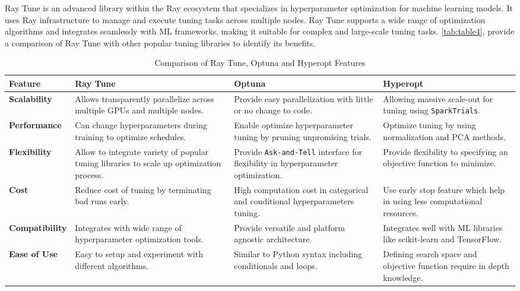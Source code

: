 Ray Tune is an advanced library within the Ray ecosystem that specializes in hyperparameter optimization for machine learning models. It uses Ray infrastructure to manage and execute tuning tasks across multiple nodes. Ray Tune supports a wide range of optimization algorithms and integrates seamlessly with ML frameworks, making it suitable for complex and large-scale tuning tasks. \autoref{tab:table4}, provide a comparison of Ray Tune with other popular tuning libraries to identify its benefits. \cite{ray_doc}



\begin{table}[ht]
\centering
\begin{tabular}{|p{3cm}|p{3.8cm}|p{3.8cm}|p{3.8cm}|}
\hline
\textbf{Feature} & \textbf{Ray Tune} & \textbf{Optuna} & \textbf{	Hyperopt} \\
\hline
\textbf{Scalability} & Allows transparently parallelize across multiple GPUs and multiple nodes. \cite{ray_doc}& Provide easy parallelization with little or no change to code. \cite{optuna_docs} & Allowing massive scale-out for tuning using \texttt{SparkTrials}. \cite{hyperopt_docs}\\
\hline
\textbf{Performance} & Can change hyperparameters during training to optimize schedules. \cite{ray_doc}& Enable optimize hyperparameter tuning by pruning unpromising trials. \cite{optuna_docs} & Optimize tuning by using normalization and PCA methods. \cite{komer2014hyperopt}\\
\hline
\textbf{Flexibility} & Allow to integrate variety of popular tuning libraries to scale up optimization process. \cite{ray_doc}& Provide \texttt{Ask-and-Tell} interface for flexibility in hyperparameter optimization. \cite{optuna_docs}& Provide flexibility to specifying an objective function to minimize. \cite{hyperopt_docs} \\
\hline
\textbf{Cost} & Reduce cost of tuning by terminating bad runs early. \cite{ray_doc} & High computation cost in categorical and conditional hyperparameters tuning. \cite{optuna_docs} & Use early stop feature which help in using less computational resources. \cite{pokhrel2023comparison}\\
\hline
\textbf{Compatibility} & Integrates with wide range of hyperparameter optimization tools. \cite{ray_doc} & Provide versatile and platform agnostic architecture. \cite{optuna_docs} & Integrates well with ML libraries like scikit-learn and TensorFlow. \cite{hyperopt_docs} \\
\hline
\textbf{Ease of Use} & Easy to setup and experiment with different algorithms. \cite{ray_doc} & Similar to Python syntax including conditionals and loops. \cite{optuna_docs}& Defining search space and objective function require in depth knowledge. \cite{hyperopt_docs}\\
\hline

\hline
\end{tabular}
\caption{Comparison of Ray Tune, Optuna and Hyperopt Features}
\label{tab:table4}
\end{table}

